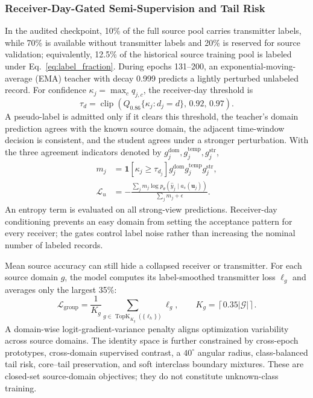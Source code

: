 \documentclass[journal]{IEEEtran}
\begin{document}
\subsubsection{Receiver-Day-Gated Semi-Supervision and Tail Risk}

In the audited checkpoint, 10\% of the full source pool carries transmitter labels, while 70\% is available without transmitter labels and 20\% is reserved for source validation; equivalently, 12.5\% of the historical source training pool is labeled under Eq.~\eqref{eq:label_fraction}. During epochs 131--200, an exponential-moving-average (EMA) teacher with decay 0.999 predicts a lightly perturbed unlabeled record. For confidence
\(\kappa_j=\max_c q_{j,c}\), the receiver-day threshold is
\begin{equation}
\tau_d=\operatorname{clip}\!\left(
Q_{0.86}\{\kappa_j:d_j=d\},\,0.92,\,0.97\right).
\label{eq:p1_threshold}
\end{equation}
A pseudo-label is admitted only if it clears this threshold, the teacher's domain prediction agrees with the known source domain, the adjacent time-window decision is consistent, and the student agrees under a stronger perturbation. With the three agreement indicators denoted by
\(g_j^{\mathrm{dom}},g_j^{\mathrm{temp}},g_j^{\mathrm{str}}\),
\begin{align}
m_j&=\mathbf{1}[\kappa_j\geq\tau_{d_j}]
g_j^{\mathrm{dom}}g_j^{\mathrm{temp}}g_j^{\mathrm{str}},\\
\mathcal{L}_{u}
&=-\frac{\sum_jm_j
\log p_{\theta}(\widehat y_j\mid a_s(\mathbf{u}_j))}
{\sum_jm_j+\epsilon}.
\label{eq:p1_ssl}
\end{align}
An entropy term is evaluated on all strong-view predictions. Receiver-day conditioning prevents an easy domain from setting the acceptance pattern for every receiver; the gates control label noise rather than increasing the nominal number of labeled records.

Mean source accuracy can still hide a collapsed receiver or transmitter. For each source domain \(g\), the model computes its label-smoothed transmitter loss \(\ell_g\) and averages only the largest 35\%:
\begin{equation}
\mathcal{L}_{\mathrm{group}}
=\frac{1}{K_g}
\sum_{g\in\operatorname{TopK}_{K_g}(\{\ell_h\})}\ell_g,
\qquad
K_g=\left\lceil0.35|\mathcal{G}|\right\rceil.
\label{eq:p1_group}
\end{equation}
A domain-wise logit-gradient-variance penalty aligns optimization variability across source domains. The identity space is further constrained by cross-epoch prototypes, cross-domain supervised contrast, a \(40^\circ\) angular radius, class-balanced tail risk, core--tail preservation, and soft interclass boundary mixtures. These are closed-set source-domain objectives; they do not constitute unknown-class training.
\end{document}
